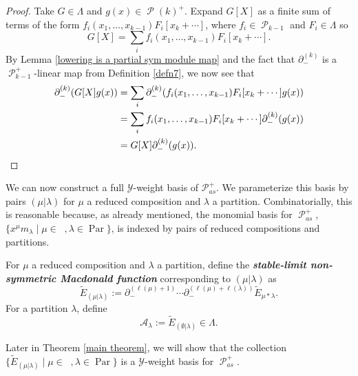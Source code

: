 \documentclass[ALCO,Unicode]{cedram}
\newcommand{\y}{{ \mathscr{Y} }}
\DeclareMathOperator{\sP}{\mathscr{P} }
\DeclareMathOperator{\Par}{\mathrm{Par}}
\DeclareMathOperator{\Compred}{\mathrm{Comp}^{\textit{red}}}
\begin{document}
\begin{proof}
    Take $G \in \Lambda$ and $g(x) \in \sP(k)^{+}$. Expand $G[X]$ as a finite sum of terms of the form $f_i(x_1,\ldots,x_{k-1})F_i[x_k + \cdots]$, where $f_i \in \sP_{k-1}$ and $F_i \in \Lambda$ so 
    $$G[X] = \sum_{i} f_i(x_1,\ldots,x_{k-1})F_i[x_k + \cdots].$$
    By Lemma \ref{lowering is a partial sym module map} and the fact that $\partial_{-}^{(k)}$ is a $\sP_{k-1}^{+}$-linear map from Definition \ref{defn7}, we now see that 
\begin{align*}
    \partial_{-}^{(k)}(G[X]g(x)) &= 
    \sum_{i} \partial_{-}^{(k)}( f_i(x_1,\ldots,x_{k-1})F_i[x_k + \cdots]g(x)) \\
    &= \sum_{i} f_i(x_1,\ldots,x_{k-1})F_i[x_k + \cdots]\partial_{-}^{(k)}(g(x)) \\
    &= G[X]\partial_{-}^{(k)}(g(x)). \qedhere
\end{align*}
\end{proof}

We can now construct a full $\y$-weight basis of $\mathscr{P}_{as}^{+}$. We parameterize this basis by pairs $(\mu | \lambda)$ for $\mu$ a reduced composition and $\lambda$ a partition. Combinatorially, this is reasonable because, as already mentioned, the monomial basis for $\sP_{as}^{+}$, $\{x^{\mu}m_{\lambda} \mid \mu \in \Compred, \lambda \in \Par\}$, is indexed by pairs of reduced compositions and partitions.

\begin{defi} \label{defn9}
For $\mu$ a reduced composition and $\lambda$ a partition, define the \textbf{\textit{stable-limit non-symmetric Macdonald function}} corresponding to $(\mu|\lambda)$ as
\begin{equation}
    \widetilde{E}_{(\mu|\lambda)} :=  \partial_{-}^{(\ell(\mu)+1)}\cdots \partial_{-}^{(\ell(\mu)+\ell(
\lambda))} \widetilde{E}_{\mu*\lambda}.
\end{equation}
For a partition $\lambda$, define
\begin{equation}\label{A-Lambda basis}
\mathcal{A}_{\lambda} := \widetilde{E}_{(\emptyset|\lambda)} \in \Lambda .
\end{equation}

\end{defi}

Later in Theorem \ref{main theorem}, we will show that the collection $\{\widetilde{E}_{(\mu|\lambda)} \mid \mu \in \Compred, \lambda \in \Par\}$ is a $\y$-weight basis for $\sP_{as}^{+}.$
\end{document}
